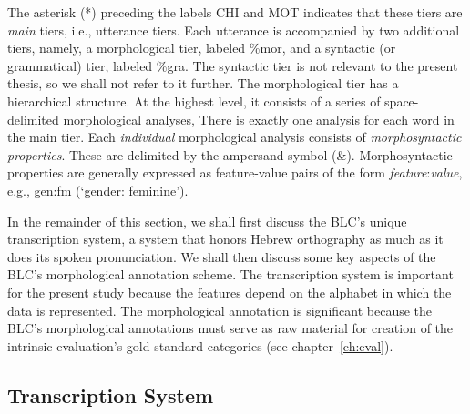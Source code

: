 The asterisk (*) preceding the labels CHI and \textsf{MOT} 
indicates that these tiers are \emph{main} tiers, i.e.,  
utterance tiers. Each utterance is accompanied by two 
additional tiers, 
namely, a morphological tier, labeled \textsf{\%mor}, 
and a syntactic (or grammatical) tier, labeled \textsf{\%gra}. 
The syntactic tier is not relevant to the present thesis,
so we shall not refer to it further. The morphological tier 
has a hierarchical structure. At the highest level, it consists of a 
series of space-delimited morphological analyses, 
There is exactly one analysis for each word in the main tier.  
Each \emph{individual} morphological analysis consists
of \textit{morphosyntactic properties}. These are delimited by the 
ampersand symbol (\textsf{\&}). Morphosyntactic properties are 
generally expressed as feature-value pairs of the 
form \textsf{\textit{feature}:\textit{value}}, e.g., 
\textsf{gen:fm} (`gender: feminine'). 

In the remainder of this section, we shall first discuss the 
BLC's unique transcription system, a system that 
honors Hebrew orthography as much as it does its spoken 
pronunciation. We shall then discuss some key aspects of 
the BLC's morphological annotation scheme. The 
transcription system is important for the present study 
because the features
depend on the alphabet in which the data is represented.
 The morphological annotation 
is significant because  the BLC's morphological annotations must 
serve as raw material for creation of  the intrinsic evaluation's 
gold-standard categories (see chapter~\ref{ch:eval}). 

\subsection{Transcription System}
\label{sec:transcription}


